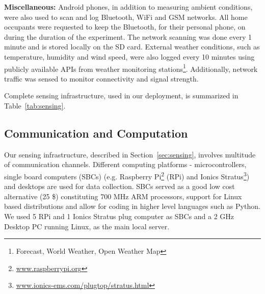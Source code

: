 \documentclass[10pt]{sensys-proc}
\newcommand{\secref}[1]{Section~\ref{#1}}
\newcommand{\tabref}[1]{Table~\ref{#1}}
\begin{document}
\noindent \textbf{Miscellaneous:} Android phones, in addition to measuring ambient conditions, were also used to scan and log Bluetooth, WiFi and GSM networks. All home occupants were requested to keep the Bluetooth, for their personal phone, on during the duration of the experiment. The network scanning was done every 1 minute and is stored locally on the SD card. External weather conditions, such as temperature, humidity and wind speed, were also logged every 10 minutes using publicly available APIs from weather monitoring stations\footnote{Forecast, World Weather, Open Weather Map}.
Additionally, network traffic was sensed to monitor connectivity and signal strength. %

Complete sensing infrastructure, used in our deployment, is summarized in \tabref{tab:sensing}.


\subsection{Communication and Computation}
Our sensing infrastructure, described in \secref{sec:sensing}, involves multitude of communication channels. Different computing platforms - microcontrollers, single board computers (SBCs) (e.g. Raspberry Pi\footnote{\url{www.raspberrypi.org}} (RPi) and Ionics Stratus\footnote{\url{www.ionics-ems.com/plugtop/stratus.html}}) and desktops are used for data collection.  
SBCs served as a good low cost alternative (25 \$) constituting 700 MHz ARM processors, support for Linux based distributions and allow for coding in higher level languages such as Python. %
We used 5 RPi and 1 Ionics Stratus plug computer as SBCs and a 2 GHz Desktop PC running Linux, as the main local server.
\end{document}
